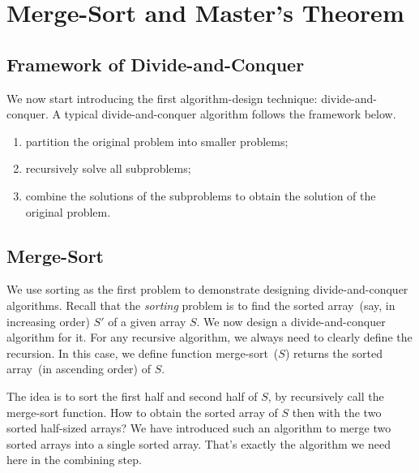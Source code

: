 \setcounter{definition}{0} \setcounter{property}{0} \setcounter{claim}{0} \setcounter{fact}{0} \setcounter{corollary}{0} \setcounter{figure}{0}
\section{Merge-Sort and Master's Theorem}

\subsection*{Framework of Divide-and-Conquer}

We now start introducing the first algorithm-design technique:
divide-and-conquer. 
A typical divide-and-conquer algorithm follows the framework below.
\vspace*{-\topsep}
\begin{enumerate}
\item partition the original problem into smaller problems;
\item recursively solve all subproblems;
\item combine the solutions of the subproblems to obtain the solution of the original problem.
\end{enumerate}

\subsection*{Merge-Sort}

We use sorting as the first problem
to demonstrate designing divide-and-conquer algorithms.
Recall that the \emph{sorting} problem is to find the sorted array~(say, in increasing order) $S'$ of a given array $S$.  
We now design a divide-and-conquer algorithm for it. For any recursive algorithm, we always need to
clearly define the recursion. In this case, we define function merge-sort~($S$) returns the
sorted array~(in ascending order) of $S$.

The idea is to sort the first half and second half of $S$, by recursively call the merge-sort function.
How to obtain the sorted array of $S$ then with the two sorted half-sized arrays?
We have introduced such an algorithm to merge two sorted arrays into a single sorted array.
That's exactly the algorithm we need here in the combining step.

\begin{minipage}{0.8\textwidth}
	\xxx
	\xxx
	\xxx
	\xxx
	\xxx
	\xxx
\end{minipage}

